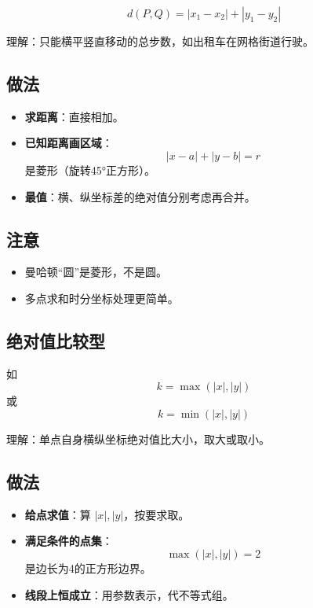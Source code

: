 \begin{definition}[曼哈顿距离]
\[
d(P, Q) = |x_1 - x_2| + |y_1 - y_2|
\]

理解：只能横平竖直移动的总步数，如出租车在网格街道行驶。


\subsection*{做法}

\begin{itemize}
    \item \textbf{求距离}：直接相加。
    \item \textbf{已知距离画区域}：
    \[
    |x - a| + |y - b| = r
    \]
    是菱形（旋转45°正方形）。
    \item \textbf{最值}：横、纵坐标差的绝对值分别考虑再合并。
\end{itemize}

\subsection*{注意}

\begin{itemize}
    \item 曼哈顿“圆”是菱形，不是圆。
    \item 多点求和时分坐标处理更简单。
\end{itemize}

\end{definition}


\subsection{绝对值比较型}

\begin{definition}[绝对值比较型]
如
\[
k = \max(|x|, |y|)
\]
或
\[
k = \min(|x|, |y|)
\]

理解：单点自身横纵坐标绝对值比大小，取大或取小。

\end{definition}

\subsection*{做法}

\begin{itemize}
    \item \textbf{给点求值}：算 \(|x|, |y|\)，按要求取。
    \item \textbf{满足条件的点集}：
    \[
    \max(|x|, |y|) = 2
    \]
    是边长为4的正方形边界。
    \item \textbf{线段上恒成立}：用参数表示，代不等式组。
\end{itemize}

